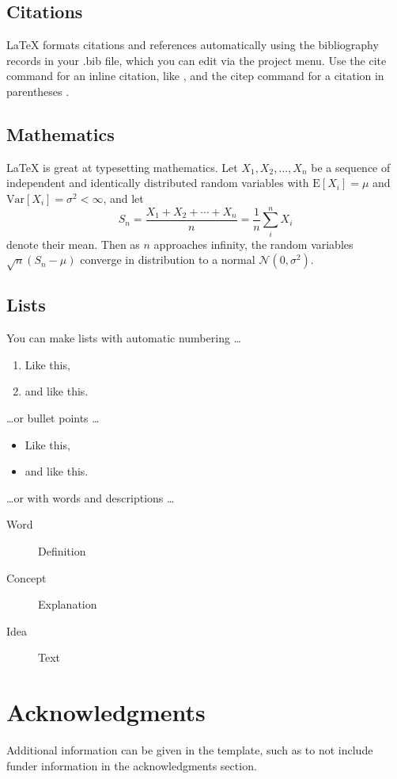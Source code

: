 \documentclass[fleqn,10pt]{olplainarticle}
\begin{document}
\subsection*{Citations}

LaTeX formats citations and references automatically using the bibliography records in your .bib file, which you can edit via the project menu. Use the cite command for an inline citation, like \cite{lees2010theoretical}, and the citep command for a citation in parentheses \citep{lees2010theoretical}.

\subsection*{Mathematics}

\LaTeX{} is great at typesetting mathematics. Let $X_1, X_2, \ldots, X_n$ be a sequence of independent and identically distributed random variables with $\text{E}[X_i] = \mu$ and $\text{Var}[X_i] = \sigma^2 < \infty$, and let
$$S_n = \frac{X_1 + X_2 + \cdots + X_n}{n}
      = \frac{1}{n}\sum_{i}^{n} X_i$$
denote their mean. Then as $n$ approaches infinity, the random variables $\sqrt{n}(S_n - \mu)$ converge in distribution to a normal $\mathcal{N}(0, \sigma^2)$.

\subsection*{Lists}

You can make lists with automatic numbering \dots

\begin{enumerate}[noitemsep] 
\item Like this,
\item and like this.
\end{enumerate}
\dots or bullet points \dots
\begin{itemize}[noitemsep] 
\item Like this,
\item and like this.
\end{itemize}
\dots or with words and descriptions \dots
\begin{description}
\item[Word] Definition
\item[Concept] Explanation
\item[Idea] Text
\end{description}

\section*{Acknowledgments}

Additional information can be given in the template, such as to not include funder information in the acknowledgments section.


\end{document}
